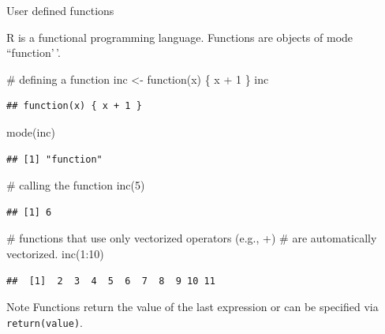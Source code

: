 \documentclass[
  9pt,
  ignorenonframetext,
]{beamer}
\newenvironment{Shaded}{\begin{snugshade}}{\end{snugshade}}
\newcommand{\CommentTok}[1]{\textcolor[rgb]{0.50,0.62,0.50}{#1}}
\newcommand{\ControlFlowTok}[1]{\textcolor[rgb]{0.94,0.87,0.69}{#1}}
\newcommand{\DecValTok}[1]{\textcolor[rgb]{0.86,0.86,0.80}{#1}}
\newcommand{\KeywordTok}[1]{\textcolor[rgb]{0.94,0.87,0.69}{#1}}
\newcommand{\NormalTok}[1]{\textcolor[rgb]{0.80,0.80,0.80}{#1}}
\newcommand{\OperatorTok}[1]{\textcolor[rgb]{0.94,0.94,0.82}{#1}}
\newcommand{\StringTok}[1]{\textcolor[rgb]{0.80,0.58,0.58}{#1}}
\begin{document}
\begin{frame}[fragile]{User defined functions}
\protect\hypertarget{user-defined-functions}{}
\small

R is a functional programming language. Functions are objects of mode
``function'\,'.

\vfill

\begin{Shaded}
\begin{Highlighting}[]
\CommentTok{\# defining a function}
\NormalTok{inc \textless{}{-}}\StringTok{ }\ControlFlowTok{function}\NormalTok{(x) \{ x }\OperatorTok{+}\StringTok{ }\DecValTok{1}\NormalTok{ \} }
\NormalTok{inc}
\end{Highlighting}
\end{Shaded}

\begin{verbatim}
## function(x) { x + 1 }
\end{verbatim}

\begin{Shaded}
\begin{Highlighting}[]
\KeywordTok{mode}\NormalTok{(inc)}
\end{Highlighting}
\end{Shaded}

\begin{verbatim}
## [1] "function"
\end{verbatim}

\begin{Shaded}
\begin{Highlighting}[]
\CommentTok{\# calling the function}
\KeywordTok{inc}\NormalTok{(}\DecValTok{5}\NormalTok{)}
\end{Highlighting}
\end{Shaded}

\begin{verbatim}
## [1] 6
\end{verbatim}

\begin{Shaded}
\begin{Highlighting}[]
\CommentTok{\# functions that use only vectorized operators (e.g., +) }
\CommentTok{\# are automatically vectorized.}
\KeywordTok{inc}\NormalTok{(}\DecValTok{1}\OperatorTok{:}\DecValTok{10}\NormalTok{)}
\end{Highlighting}
\end{Shaded}

\begin{verbatim}
##  [1]  2  3  4  5  6  7  8  9 10 11
\end{verbatim}

\vfill

\begin{block}{Note}
\protect\hypertarget{note}{}
Functions return the value of the last expression or can be specified
via \texttt{return(value)}.
\end{block}
\end{frame}
\end{document}
